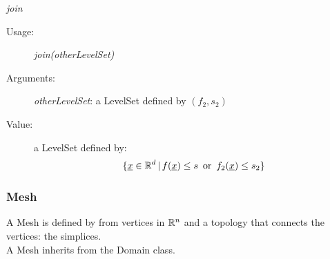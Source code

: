 \begin{description}
\begin{description}
\item \textit{join}
\begin{description}
\item[Usage:] \textit{join(otherLevelSet)}
\item[Arguments:] \textit{otherLevelSet}: a LevelSet defined by $(f_2, s_2)$ 
\item[Value:]  a LevelSet defined by: 
\begin{align}\label{domDef2}
\{ {\underline{x}} \in {\mathbb R}^d \, | \, f({\underline{x}}) \leq s  \, \mbox{ or } \,  f_2({\underline{x}}) \leq s_2\}
\end{align}
\end{description}



\end{description}

\end{description}





\newpage
{}
\subsubsection{Mesh}

A Mesh is defined by from vertices in ${\mathbb R}^n$ and a topology that connects the vertices: the simplices.\\
A Mesh inherits from the Domain class.

